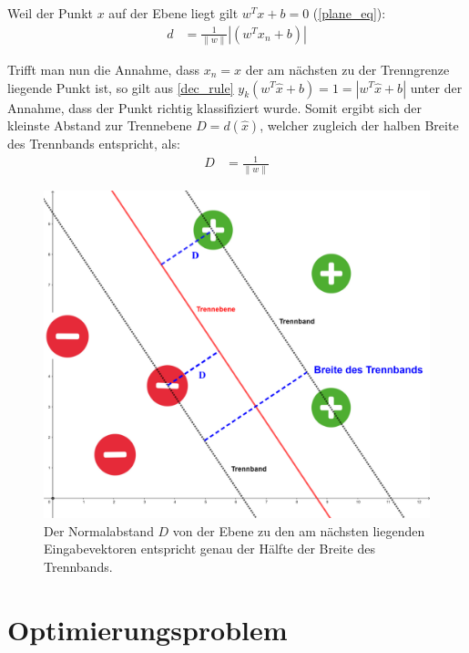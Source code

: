 \documentclass[a4paper,11pt,twoside]{scrreprt}
\newcommand{\norm}[1]{\lVert#1\rVert}
\begin{document}
Weil der Punkt $x$ auf der Ebene liegt gilt $w^{T} x + b = 0$ (\autoref{plane_eq}):
\begin{equation} \label{distance_to_plane_simplified1}
	\begin{aligned}
		d &= \frac{1}{\norm{w}} | (w^{T} x_{n} + b) |
	\end{aligned}
\end{equation}

Trifft man nun die Annahme, dass $x_{n} = \hat{x}$ der am nächsten zu der Trenngrenze liegende Punkt ist, so gilt aus \autoref{dec_rule} $y_{k} (w^{T} \hat{x} + b) = 1 = |w^{T} \hat{x} + b|$ unter der Annahme, dass der Punkt richtig klassifiziert wurde. Somit ergibt sich der kleinste Abstand zur Trennebene $D = d(\hat{x})$, welcher zugleich der halben Breite des Trennbands entspricht, als:
\begin{equation} \label{distance_to_plane_simplified2}
	\begin{aligned}
		D &= \frac{1}{\norm{w}}
	\end{aligned}
\end{equation}

\begin{figure}[H]
	\centering
	\includegraphics[width = 12cm]{assets/trennband_mit_D.png}
	\caption{Der Normalabstand $D$ von der Ebene zu den am nächsten liegenden Eingabevektoren entspricht genau der Hälfte der Breite des Trennbands.}
	\label{fig:trennband2}
\end{figure}


\section{Optimierungsproblem}
\end{document}
